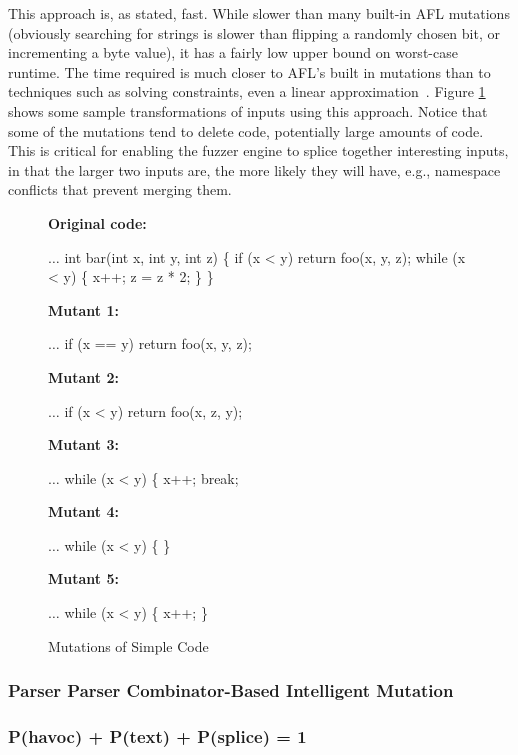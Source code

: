 This approach is, as stated, fast.  While slower than many built-in
AFL mutations (obviously searching for strings is slower than flipping
a randomly chosen bit, or incrementing a byte value), it has a fairly
low upper bound on worst-case runtime.  The time required is much
closer to AFL's built in mutations than to techniques such as
solving constraints, even a linear
approximation~\cite{Eclipser}.  Figure \ref{fig:fopexample} shows some
sample transformations of inputs using this approach.  Notice that
some of the mutations tend to delete code, potentially large amounts
of code.  This is critical for enabling the fuzzer engine to splice
together interesting inputs, in that the larger two inputs are, the
more likely they will have, e.g., namespace conflicts that prevent
merging them.

\begin{figure}
  \raggedright
  {\scriptsize
    {\bf Original code:}
\begin{code}
$\ldots$      
 int bar(int x, int y, int z) \{
   if (x < y)
      return foo(x, y, z);
   while (x < y) \{
      x++;
      z = z * 2;
   \}
\}
\end{code}
   {\bf Mutant 1:}
\begin{code}
$\ldots$      
   if (x == y)
      return foo(x, y, z);
\end{code}
   {\bf Mutant 2:}
\begin{code}
$\ldots$      
   if (x < y)
      return foo(x, z, y);
\end{code}
   {\bf Mutant 3:}
\begin{code}
$\ldots$      
   while (x < y) \{
      x++;
      break;
    \end{code}
   {\bf Mutant 4:}
\begin{code}
$\ldots$      
   while (x < y) \{
   \}
 \end{code}
 {\bf Mutant 5:}
\begin{code}
$\ldots$      
   while (x < y) \{
     x++;
   \}
 \end{code}

}
\caption{Mutations of  Simple Code}
\label{fig:fopexample}
\end{figure}

\subsubsection{Parser Parser Combinator-Based Intelligent Mutation}

\subsubsection{P(havoc) + P(text) + P(splice) = 1}

